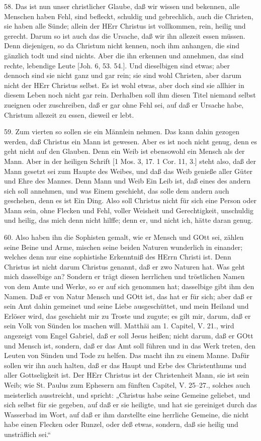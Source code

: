58. Das ist nun unser christlicher Glaube, daß wir wissen und bekennen, alle Menschen haben Fehl, sind befleckt, schuldig und gebrechlich, auch die Christen, sie haben alle Sünde; allein der HErr Christus ist vollkommen, rein, heilig und gerecht. Darum so ist auch das die Ursache, daß wir ihn allezeit essen müssen. Denn diejenigen, so da Christum nicht kennen, noch ihm anhangen, die sind gänzlich todt und sind nichts. Aber die ihn erkennen und annehmen, das sind rechte, lebendige Leute [Joh. 6, 53. 54.]. Und dieselbigen sind etwas; aber dennoch sind sie nicht ganz und gar rein; sie sind wohl Christen, aber darum nicht der HErr Christus selbst. Es ist wohl etwas, aber doch sind sie allhier in diesem Leben noch nicht gar rein. Derhalben soll ihm diesen Titel niemand selbst zueignen oder zuschreiben, daß er gar ohne Fehl sei, auf daß er Ursache habe, Christum allezeit zu essen, dieweil er lebt.

59. Zum vierten so sollen sie ein Männlein nehmen. Das kann dahin gezogen werden, daß Christus ein Mann ist gewesen. Aber es ist noch nicht genug, denn es geht nicht auf den Glauben. Denn ein Weib ist ebensowohl ein Mensch als der Mann. Aber in der heiligen Schrift [1 Mos. 3, 17. 1 Cor. 11, 3.] steht also, daß der Mann gesetzt sei zum Haupte des Weibes, und daß das Weib genieße aller Güter und Ehre des Mannes. Denn Mann und Weib Ein Leib ist, daß eines des andern sich soll annehmen, und was Einem geschieht, das solle dem andern auch geschehen, denn es ist Ein Ding. Also soll Christus nicht für sich eine Person oder Mann sein, ohne Flecken und Fehl, voller Weisheit und Gerechtigkeit, unschuldig und heilig, das mich denn nicht hilffe; denn er, und nicht ich, hätte daran genug.

60. Also haben ihn die Sophisten gemalt, wie er Mensch und GOtt sei, zählen seine Beine und Arme, mischen seine beiden Naturen wunderlich in einander; welches denn nur eine sophistishe Erkenntniß des HErrn Christi ist. Denn Christus ist nicht darum Christus genannt, daß er zwo Naturen hat. Was geht mich dasselbige an? Sondern er trägt diesen herrlichen und tröstlichen Namen von dem Amte und Werke, so er auf sich genommen hat; dasselbige gibt ihm den Namen. Daß er von Natur Mensch und GOtt ist, das hat er für sich; aber daß er sein Amt dahin gemeinet und seine Liebe ausgeschüttet, und mein Heiland und Erlöser wird, das geschieht mir zu Troste und zugute; es gilt mir, darum, daß er sein Volk von Sünden los machen will. Matthäi am 1. Capitel, V. 21., wird angezeigt vom Engel Gabriel, daß er soll Jesus heißen; nicht darum, daß er GOtt und Mensch ist, sondern, daß er das Amt soll führen und in das Werk treten, den Leuten von Sünden und Tode zu helfen. Das macht ihn zu einem Manne. Dafür sollen wir ihn auch halten, daß er das Haupt und Erbe des Christenthums und aller Gottseligkeit ist. Der HErr Christus ist der Christenheit Mann, sie ist sein Weib; wie St. Paulus zum Ephesern am fünften Capitel, V. 25–27., solches auch meisterlich ausstreicht, und spricht: „Christus habe seine Gemeine geliebet, und sich selbst für sie gegeben, auf daß er sie heiligte, und hat sie gereiniget durch das Wasserbad im Wort, auf daß er ihm darstellte eine herrliche Gemeine, die nicht habe einen Flecken oder Runzel, oder deß etwas, sondern, daß sie heilig und unsträflich sei.“

